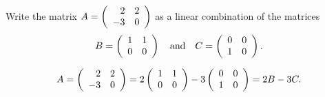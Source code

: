 \documentclass{ximera}
\begin{document}
\begin{exercise} \label{c5.2.4}
Write the matrix $A=\mattwo{2}{2}{-3}{0}$ as a linear combination
of the matrices
\[
B=\mattwo{1}{1}{0}{0} \AND C=\mattwo{0}{0}{1}{0}.
\]

\begin{solution}
\ans
\[ A = \mattwo{2}{2}{-3}{0} = 2\mattwo{1}{1}{0}{0} -
3\mattwo{0}{0}{1}{0} = 2B - 3C. \]

\end{solution}
\end{exercise}
\end{document}

